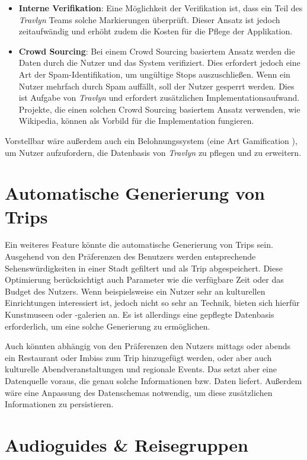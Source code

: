 		\begin{itemize}
			\item \textbf{Interne Verifikation}: Eine Möglichkeit der Verifikation ist, dass ein Teil des \textit{Travlyn} Teams solche Markierungen überprüft. Dieser Ansatz ist jedoch zeitaufwändig und erhöht zudem die Kosten für die Pflege der Applikation. 
			\item \textbf{Crowd Sourcing}: Bei einem Crowd Sourcing basiertem Ansatz werden die Daten durch die Nutzer und das System verifiziert. Dies erfordert jedoch eine Art der Spam-Identifikation, um ungültige Stops auszuschließen. Wenn ein Nutzer mehrfach durch Spam auffällt, soll der Nutzer gesperrt werden. Dies ist Aufgabe von \textit{Travlyn} und erfordert zusätzlichen Implementationsaufwand. Projekte, die einen solchen Crowd Sourcing basiertem Ansatz verwenden, wie Wikipedia, können als Vorbild für die Implementation fungieren. 
		\end{itemize}
	
		Vorstellbar wäre außerdem auch ein Belohnungssystem (eine Art Gamification \cite{Zichermann.2011}), um Nutzer aufzufordern, die Datenbasis von \textit{Travlyn} zu pflegen und zu erweitern. 
				
	\section{Automatische Generierung von Trips}
	
		Ein weiteres Feature könnte die automatische Generierung von Trips sein. Ausgehend von den Präferenzen des Benutzers werden entsprechende Sehenswürdigkeiten in einer Stadt gefiltert und als Trip abgespeichert. Diese Optimierung berücksichtigt auch Parameter wie die verfügbare Zeit oder das Budget des Nutzers. Wenn beispielsweise ein Nutzer sehr an kulturellen Einrichtungen interessiert ist, jedoch nicht so sehr an Technik, bieten sich hierfür \zB Kunstmuseen oder -galerien an. Es ist allerdings eine gepflegte Datenbasis erforderlich, um eine solche Generierung zu ermöglichen. 
		
		Auch könnten abhängig von den Präferenzen den Nutzers mittags oder abends ein Restaurant oder Imbiss zum Trip hinzugefügt werden, oder aber auch kulturelle Abendveranstaltungen und regionale Events. Das setzt aber eine Datenquelle voraus, die genau solche Informationen bzw. Daten liefert. Außerdem wäre eine Anpassung des Datenschemas notwendig, um diese zusätzlichen Informationen zu persistieren. 
		
	\section{Audioguides \& Reisegruppen}
	

